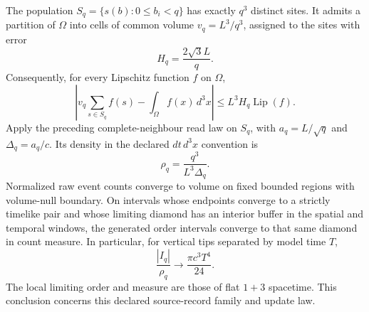 \begin{proposition}
\label{prop:golden-source-count-limit}
The population $S_q=\{s(b):0\leq b_i<q\}$ has exactly $q^3$ distinct
sites. It admits a partition of $\Omega$ into cells of common volume
$v_q=L^3/q^3$, assigned to the sites with error
\begin{equation}
 H_q=\frac{2\sqrt3 L}{q}.
 \label{eq:golden-source-assignment}
\end{equation}
Consequently, for every Lipschitz function $f$ on $\Omega$,
\[
 \left|v_q\sum_{s\in S_q}f(s)-\int_\Omega f(x)\,d^3x\right|
 \leq L^3 H_q\operatorname{Lip}(f).
\]
Apply the preceding complete-neighbour read law on $S_q$, with
$a_q=L/\sqrt q$ and $\Delta_q=a_q/c$. Its density in the declared
$dt\,d^3x$ convention is
\begin{equation}
 \rho_q=\frac{q^3}{L^3\Delta_q}.
 \label{eq:golden-source-event-density}
\end{equation}
Normalized raw event counts converge to volume on fixed bounded regions
with volume-null boundary. On intervals whose endpoints converge to a
strictly timelike pair and whose limiting diamond has an interior buffer
in the spatial and temporal windows, the generated order intervals
converge to that same diamond in count measure. In particular, for vertical
tips separated by model time $T$,
\[
 \frac{|I_q|}{\rho_q}\longrightarrow\frac{\pi c^3T^4}{24}.
\]
The local limiting order and measure are those of flat $1+3$ spacetime.
This conclusion concerns this declared source-record family and update law.
\end{proposition}
